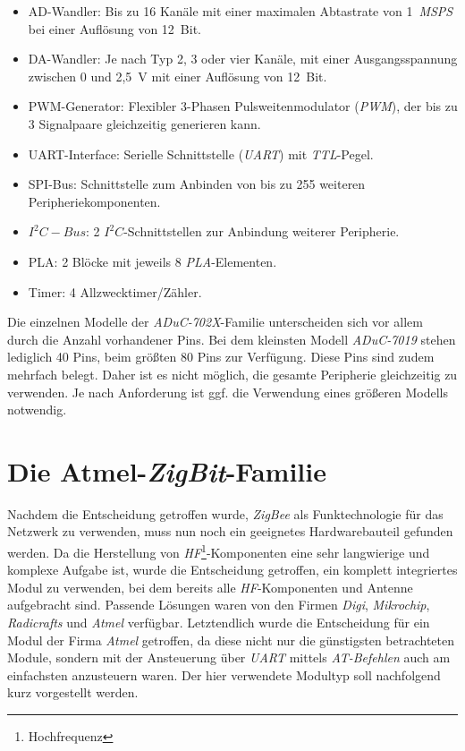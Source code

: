         \begin{itemize}
            \item{AD-Wandler:} Bis zu 16 Kanäle mit einer maximalen Abtastrate von 1~\emph{MSPS} bei einer Auflösung von 
                               12~Bit.
            \item{DA-Wandler:} Je nach Typ 2, 3 oder vier Kanäle, mit einer Ausgangsspannung zwischen 0 und 2,5~V mit einer
                               Auflösung von 12~Bit.
            \item{PWM-Generator:} Flexibler 3-Phasen Pulsweitenmodulator (\emph{PWM}), der bis zu 3 Signalpaare 
                                  gleichzeitig generieren kann.
            \item{UART-Interface:} Serielle Schnittstelle (\emph{UART}) mit \emph{TTL}-Pegel.
            \item{SPI-Bus:} Schnittstelle zum Anbinden von bis zu 255 weiteren Peripheriekomponenten.
            \item{$I^2C-Bus$:} 2 \emph{$I^2C$}-Schnittstellen zur Anbindung weiterer Peripherie.
            \item{PLA:} 2 Blöcke mit jeweils 8 \emph{PLA}-Elementen.
            \item{Timer:} 4 Allzwecktimer/Zähler.
        \end{itemize}
        
        Die einzelnen Modelle der \emph{ADuC-702X}-Familie unterscheiden sich vor allem durch die Anzahl vorhandener 
        Pins. Bei dem kleinsten Modell \emph{ADuC-7019} stehen lediglich 40 Pins, beim größten 80 Pins zur Verfügung. 
        Diese Pins sind zudem mehrfach belegt. Daher ist es nicht möglich, die gesamte Peripherie gleichzeitig zu 
        verwenden. Je nach Anforderung ist ggf. die Verwendung eines größeren Modells notwendig. 


\section{Die Atmel-\emph{ZigBit}-Familie}

    Nachdem die Entscheidung getroffen wurde, \emph{ZigBee} als Funktechnologie für das Netzwerk zu verwenden, muss
    nun noch ein geeignetes Hardwarebauteil gefunden werden. Da die Herstellung von \emph{HF}\footnote{Hochfrequenz}-Komponenten
    eine sehr langwierige und komplexe Aufgabe ist, wurde die Entscheidung getroffen, ein komplett integriertes Modul zu verwenden, bei dem bereits alle 
    \emph{HF}-Komponenten und Antenne aufgebracht sind. Passende Lösungen waren von den Firmen \emph{Digi}, 
    \emph{Mikrochip}, \emph{Radicrafts} und \emph{Atmel} verfügbar. Letztendlich wurde die Entscheidung für
    ein Modul der Firma \emph{Atmel} getroffen, da diese nicht nur die günstigsten betrachteten Module,
    sondern mit der Ansteuerung über \emph{UART} mittels \emph{AT-Befehlen} auch am einfachsten anzusteuern waren.
    Der hier verwendete Modultyp soll nachfolgend kurz vorgestellt werden.

